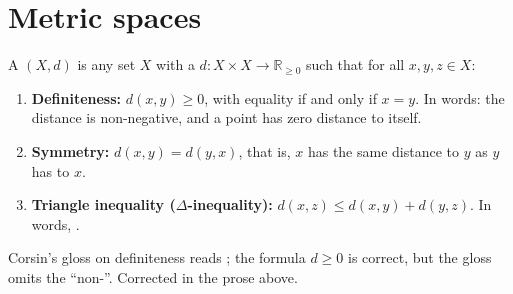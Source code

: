 
\section{Metric spaces}
\label{sec:metric_spaces}

\begin{definition}
\label{def:metric_space}
A   $(X,d)$ is any set $X$ with a
  $d : X \times X \to \mathbb{R}_{\geq 0}$ such that for all
$x, y, z \in X$:
\begin{enumerate}[label=\textbf{(\alph*)}]
  \item \textbf{Definiteness:} $d(x,y) \geq 0$, with equality if and only if $x = y$. In words: the
    distance is non-negative, and a point has zero distance to itself.
  \item \textbf{Symmetry:} $d(x,y) = d(y,x)$, that is, $x$ has the same distance to $y$ as $y$
    has to $x$.
  \item \textbf{Triangle inequality ($\Delta$-inequality):} $d(x,z) \leq d(x,y) + d(y,z)$. In
    words, .
\end{enumerate}
\end{definition}

\begin{ainote}
Corsin's gloss on definiteness reads ; the formula $d \geq 0$ is
correct, but the gloss omits the ``non-''. Corrected in the prose above.
\end{ainote}

\begin{center}
\end{center}

